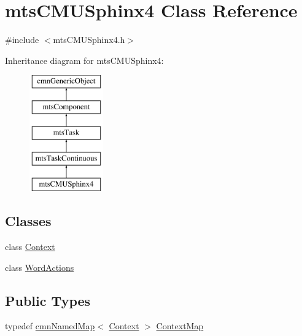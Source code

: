 \hypertarget{classmts_c_m_u_sphinx4}{\section{mts\-C\-M\-U\-Sphinx4 Class Reference}
\label{classmts_c_m_u_sphinx4}
}


{\ttfamily \#include $<$mts\-C\-M\-U\-Sphinx4.\-h$>$}

Inheritance diagram for mts\-C\-M\-U\-Sphinx4\-:\begin{figure}[H]
\begin{center}
\leavevmode
\includegraphics[height=5.000000cm]{df/d41/classmts_c_m_u_sphinx4}
\end{center}
\end{figure}
\subsection*{Classes}
\begin{DoxyCompactItemize}
\item 
class \hyperlink{classmts_c_m_u_sphinx4_1_1_context}{Context}
\item 
class \hyperlink{classmts_c_m_u_sphinx4_1_1_word_actions}{Word\-Actions}
\end{DoxyCompactItemize}
\subsection*{Public Types}
\begin{DoxyCompactItemize}
\item 
typedef \hyperlink{classcmn_named_map}{cmn\-Named\-Map}$<$ \hyperlink{classmts_c_m_u_sphinx4_1_1_context}{Context} $>$ \hyperlink{classmts_c_m_u_sphinx4_a5cf708712c99bce418627789835920d8}{Context\-Map}
\end{DoxyCompactItemize}
